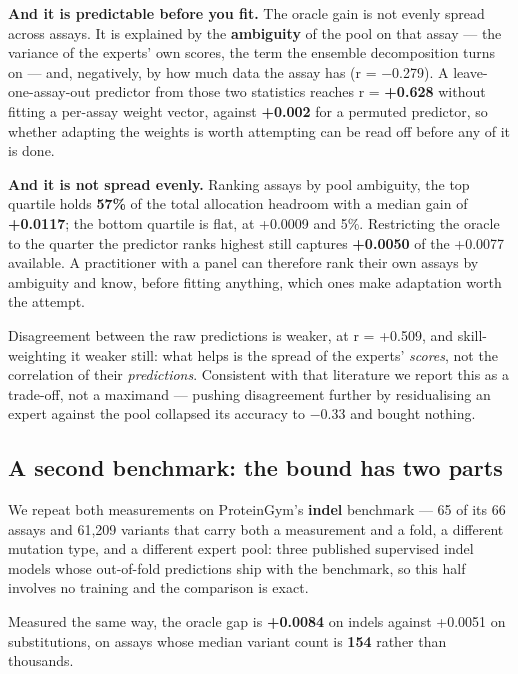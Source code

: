 \documentclass{article}
\begin{document}
\textbf{And it is predictable before you fit.} The oracle gain is not evenly spread across assays. It is explained by
the \textbf{ambiguity} of the pool on that assay --- the variance of the experts' own scores, the term the ensemble
decomposition turns on \cite{audhkhasi2013generalized,wood2023unified} --- and, negatively, by how much data the
assay has (r = −0.279). A leave-one-assay-out predictor from those two statistics reaches r = \textbf{+0.628} without fitting a per-assay weight
vector, against \textbf{+0.002} for a permuted predictor, so whether adapting the weights is worth attempting can be read
off before any of it is done.

\textbf{And it is not spread evenly.} Ranking assays by pool ambiguity, the top quartile holds \textbf{57\%} of the total
allocation headroom with a median gain of \textbf{+0.0117}; the bottom quartile is flat, at +0.0009 and 5\%. Restricting
the oracle to the quarter the predictor ranks highest still captures \textbf{+0.0050} of the +0.0077 available. A
practitioner with a panel can therefore rank their own assays by ambiguity and know, before fitting anything,
which ones make adaptation worth the attempt.

Disagreement between the raw predictions is weaker, at r = +0.509, and skill-weighting it weaker still: what helps
is the spread of the experts' \emph{scores}, not the correlation of their \emph{predictions}. Consistent
with that literature we report this as a trade-off, not a maximand --- pushing disagreement further by residualising
an expert against the pool collapsed its accuracy to −0.33 and bought nothing.

\subsection{A second benchmark: the bound has two parts}\label{a-second-benchmark-the-bound-has-two-parts}

We repeat both measurements on ProteinGym's \textbf{indel} benchmark --- 65 of its 66 assays and 61,209 variants that carry both a measurement and a fold, a
different mutation type, and a different expert pool: three published supervised indel models whose
out-of-fold predictions ship with the benchmark, so this half involves no training and the comparison is
exact.

Measured the same way, the oracle gap is \textbf{+0.0084} on indels against +0.0051 on substitutions, on assays whose
median variant count is \textbf{154} rather than thousands.
\end{document}
